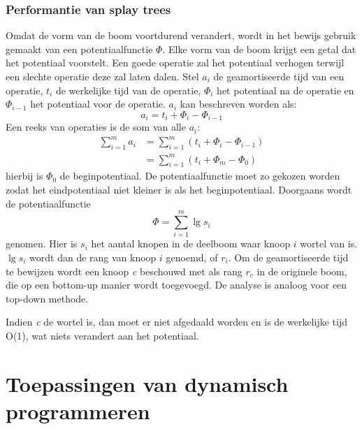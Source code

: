 \documentclass{report}
\begin{document}
	\subsection{Performantie van splay trees}
	Omdat de vorm van de boom voortdurend verandert, wordt in het bewijs gebruik gemaakt van een potentiaalfunctie $\Phi$. Elke vorm van de boom krijgt een getal dat het potentiaal voorstelt. Een goede operatie zal het potentiaal verhogen terwijl een slechte operatie deze zal laten dalen. Stel $a_i$ de geamortiseerde tijd van een operatie, $t_i$ de werkelijke tijd van de operatie, $\Phi_i$ het potentiaal na de operatie en $\Phi_{i - 1}$ het potentiaal voor de operatie. $a_i$ kan beschreven worden als: 
	$$a_i = t_i + \Phi_i - \Phi_{i - 1}$$ Een reeks van operaties is de som van alle $a_i$:
	\begin{equation*}
	\begin{split}
		\sum_{i = 1}^{m} a_i & = \sum_{i = 1}^{m} (t_i + \Phi_i - \Phi_{i - 1}) \\
							   & =  \sum_{i = 1}^{m} (t_i + \Phi_m - \Phi_0)
	\end{split}
	\end{equation*}
	hierbij is $\Phi_0$ de beginpotentiaal. De potentiaalfunctie moet zo gekozen worden zodat het eindpotentiaal niet kleiner is als het beginpotentiaal. Doorgaans wordt de potentiaalfunctie 
	$$\Phi = \sum_{i = 1}^m \lg s_i$$
	genomen. Hier is $s_i$ het aantal knopen in de deelboom waar knoop $i$ wortel van is. $\lg s_i$ wordt dan de rang van knoop $i$ genoemd, of $r_i$. Om de geamortiseerde tijd te bewijzen wordt een knoop \textit{c} beschouwd met als rang $r_c$ in de originele boom, die op een bottom-up manier wordt toegevoegd. De analyse is analoog voor een top-down methode.
	
	
	
	Indien \textit{c} de wortel is, dan moet er niet afgedaald worden en is de werkelijke tijd O(1), wat niets verandert aan het potentiaal.
	

	\chapter{Toepassingen van dynamisch programmeren}
\end{document}
